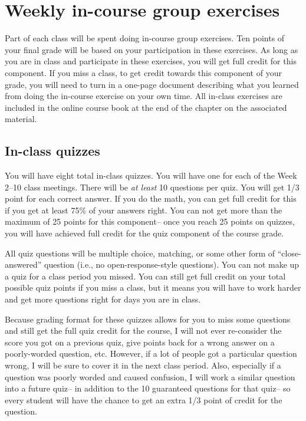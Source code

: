 \documentclass[]{book}
\begin{document}
\section{Weekly in-course group
exercises}\label{weekly-in-course-group-exercises}

Part of each class will be spent doing in-course group exercises. Ten
points of your final grade will be based on your participation in these
exercises. As long as you are in class and participate in these
exercises, you will get full credit for this component. If you miss a
class, to get credit towards this component of your grade, you will need
to turn in a one-page document describing what you learned from doing
the in-course exercise on your own time. All in-class exercises are
included in the online course book at the end of the chapter on the
associated material.

\subsection{In-class quizzes}\label{in-class-quizzes}

You will have eight total in-class quizzes. You will have one for each
of the Week 2--10 class meetings. There will be \emph{at least} 10
questions per quiz. You will get 1/3 point for each correct answer. If
you do the math, you can get full credit for this if you get at least
75\% of your answers right. You can not get more than the maximum of 25
points for this component-- once you reach 25 points on quizzes, you
will have achieved full credit for the quiz component of the course
grade.

All quiz questions will be multiple choice, matching, or some other form
of ``close-answered'' question (i.e., no open-response-style questions).
You can not make up a quiz for a class period you missed. You can still
get full credit on your total possible quiz points if you miss a class,
but it means you will have to work harder and get more questions right
for days you are in class.

Because grading format for these quizzes allows for you to miss some
questions and still get the full quiz credit for the course, I will not
ever re-consider the score you got on a previous quiz, give points back
for a wrong answer on a poorly-worded question, etc. However, if a lot
of people got a particular question wrong, I will be sure to cover it in
the next class period. Also, especially if a question was poorly worded
and caused confusion, I will work a similar question into a future
quiz-- in addition to the 10 guaranteed questions for that quiz-- so
every student will have the chance to get an extra 1/3 point of credit
for the question.
\end{document}
